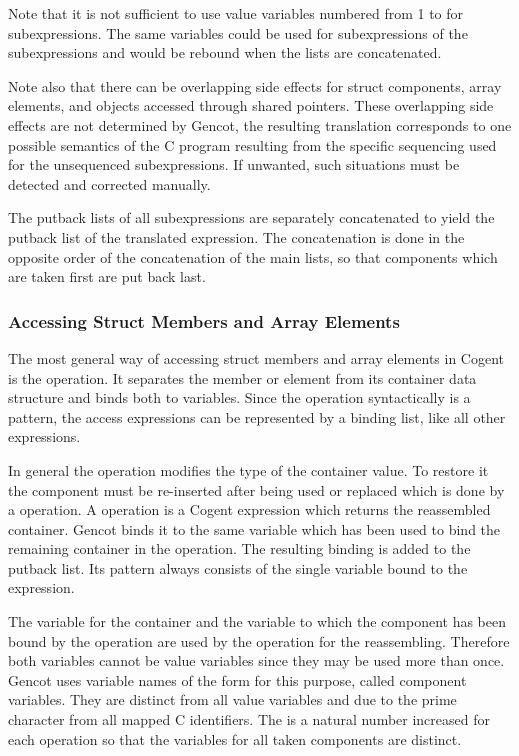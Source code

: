 Note that it is not sufficient to use value variables numbered from 1 to  for  subexpressions. The same variables
could be used for subexpressions of the subexpressions and would be rebound when the lists are concatenated.

Note also that there can be overlapping side effects for struct components, array elements, and objects accessed through
shared pointers. These overlapping side effects are not determined by Gencot, the resulting translation corresponds to
one possible semantics of the C program resulting from the specific sequencing used for the unsequenced subexpressions. 
If unwanted, such situations must be detected and corrected manually.

The putback lists of all subexpressions are separately concatenated to yield the putback list of the translated expression.
The concatenation is done in the opposite order of the concatenation of the main lists, so that components which are taken
first are put back last.

\subsubsection{Accessing Struct Members and Array Elements}

The most general way of accessing struct members and array elements in Cogent is the  operation. It separates
the member or element from its container data structure and binds both to variables. Since the  operation 
syntactically is a pattern, the access expressions can be represented by a binding list, like all other expressions.

In general the  operation modifies the type of the container value. To restore it the component must 
be re-inserted after being used or replaced which is done by a  operation. A  operation is a Cogent
expression which returns the reassembled container. Gencot binds it to the same variable which has been used 
to bind the remaining container in the  operation. The resulting binding is added to the putback list.
Its pattern always consists of the single variable bound to the  expression.

The variable for the container and the variable to which the component has been
bound by the  operation are used by the  operation for the reassembling. Therefore both variables cannot
be value variables since they may be used more than once. Gencot uses variable names of the form  for this 
purpose, called component variables. They are distinct from all value variables and due to the prime character from all 
mapped C identifiers. The  is a natural number increased for each  operation so that the variables 
for all taken components are distinct.

